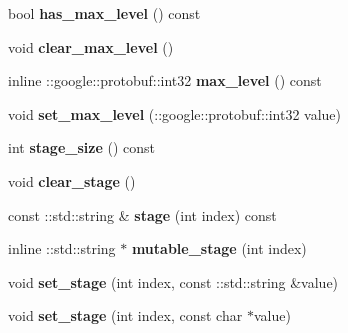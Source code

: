 \begin{DoxyCompactItemize}
bool {\bfseries has\+\_\+max\+\_\+level} () const
\item 
\mbox{\label{classcaffe_1_1_net_state_rule_a02201681dbe54e2d2d02a94d7841fccf}} 
void {\bfseries clear\+\_\+max\+\_\+level} ()
\item 
\mbox{\label{classcaffe_1_1_net_state_rule_a1a7cef573c0598ef612174ac63c1bfd0}} 
inline \+::google\+::protobuf\+::int32 {\bfseries max\+\_\+level} () const
\item 
\mbox{\label{classcaffe_1_1_net_state_rule_adcea8e21e7ae589ad3316eaf07c51228}} 
void {\bfseries set\+\_\+max\+\_\+level} (\+::google\+::protobuf\+::int32 value)
\item 
\mbox{\label{classcaffe_1_1_net_state_rule_aa665f1841fa642b0d0b0527dd37dbf31}} 
int {\bfseries stage\+\_\+size} () const
\item 
\mbox{\label{classcaffe_1_1_net_state_rule_ae6a7cd27ce34d90988731d9adc37b445}} 
void {\bfseries clear\+\_\+stage} ()
\item 
\mbox{\label{classcaffe_1_1_net_state_rule_ac1c70700ba25fda3971d98922eb957d4}} 
const \+::std\+::string \& {\bfseries stage} (int index) const
\item 
\mbox{\label{classcaffe_1_1_net_state_rule_a4e43a60d5ad6371a4506e6e92c4713da}} 
inline \+::std\+::string $\ast$ {\bfseries mutable\+\_\+stage} (int index)
\item 
\mbox{\label{classcaffe_1_1_net_state_rule_a11abbdfff3759dde9becc36de61fab10}} 
void {\bfseries set\+\_\+stage} (int index, const \+::std\+::string \&value)
\item 
\mbox{\label{classcaffe_1_1_net_state_rule_a8de20534f80e1c43f6341dab254dab80}} 
void {\bfseries set\+\_\+stage} (int index, const char $\ast$value)
\item 
\mbox{\label{classcaffe_1_1_net_state_rule_ae52ad02c76da933019b934b02dc02500}} 

\end{DoxyCompactItemize}
